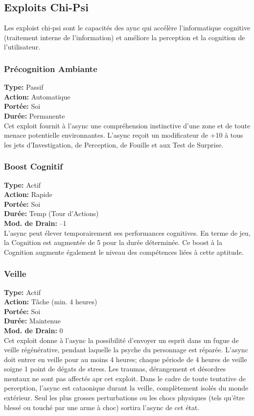 \subsection{Exploits Chi-Psi} Les exploist chi-psi sont le capacités des aync qui accélère l'informatique cognitive (traitement interne de l'information) et améliore la perception et la cognition de l'utilisateur. 

\subsubsection{Précognition Ambiante} \textbf{Type:} Passif \\ \textbf{Action:} Automatique \\ \textbf{Portée:} Soi \\ \textbf{Durée:} Permanente \\ Cet exploit fournit à l'async une compréhension instinctive d'une zone et de toute menace potentielle environnantes. L'async reçoit un modificateur de +10 à tous les jets d'Investigation, de Perception, de Fouille et aux Test de Surprise. 

\subsubsection{Boost Cognitif} \textbf{Type:} Actif \\ \textbf{Action:} Rapide \\ \textbf{Portée:} Soi \\ \textbf{Durée:} Temp (Tour d'Actions) \\ \textbf{Mod. de Drain:} –1 \\ L'async peut élever temporairement ses performances cognitives. En terme de jeu, la Cognition est augmentée de 5 pour la durée déterminée. Ce boost à la Cognition augmente également  le niveau des compétences liées à cette aptitude. 

\subsubsection{Veille} \textbf{Type:} Actif \\ \textbf{Action:} Tâche (min. 4 heures) \\ \textbf{Portée:} Soi \\ \textbf{Durée:} Maintenue \\ \textbf{Mod. de Drain:} 0 \\ Cet exploit donne à l'async la possibilité d'envoyer un esprit dans un fugue de veille régénérative, pendant laquelle la psyche du personnage est réparée. L'async doit entrer en veille pour au moins 4 heures; chaque période de 4 heures de veille soigne 1 point de dégats de stress. Les traumas, dérangement et désordres mentaux ne sont pas affectés apr cet exploit. Dans le cadre de toute tentative de perception, l'async est cataonique durant la veille, complètement isolés du monde extérieur. Seul les plus grosses perturbations ou les chocs physiques (tels qu'être blessé ou touché par une arme à choc) sortira l'async de cet état. 

